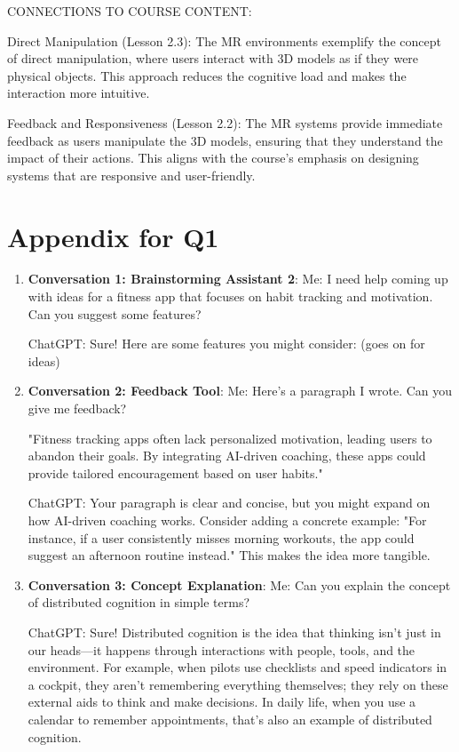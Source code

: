 \documentclass[
	letterpaper, %
]{jdf}
\begin{document}
CONNECTIONS TO COURSE CONTENT:

Direct Manipulation (Lesson 2.3): The MR environments exemplify the concept of direct manipulation, where users interact with 3D models as if they were physical objects. This approach reduces the cognitive load and makes the interaction more intuitive.

Feedback and Responsiveness (Lesson 2.2): The MR systems provide immediate feedback as users manipulate the 3D models, ensuring that they understand the impact of their actions. This aligns with the course’s emphasis on designing systems that are responsive and user-friendly.

\hfill \break  

\section{Appendix for Q1}

\printbibliography[heading=none]
\begin{enumerate}
    \item \textbf{Conversation 1: Brainstorming Assistant 2}: \hfill \break
    Me: I need help coming up with ideas for a fitness app that focuses on habit tracking and motivation. Can you suggest some features?

ChatGPT: Sure! Here are some features you might consider: (goes on for ideas) 
\item \textbf{Conversation 2: Feedback Tool}: \hfill \break Me: Here’s a paragraph I wrote. Can you give me feedback?

"Fitness tracking apps often lack personalized motivation, leading users to abandon their goals. By integrating AI-driven coaching, these apps could provide tailored encouragement based on user habits."

ChatGPT: Your paragraph is clear and concise, but you might expand on how AI-driven coaching works. Consider adding a concrete example: "For instance, if a user consistently misses morning workouts, the app could suggest an afternoon routine instead." This makes the idea more tangible.
\item \textbf{Conversation 3: Concept Explanation}: \hfill \break Me: Can you explain the concept of distributed cognition in simple terms?

ChatGPT: Sure! Distributed cognition is the idea that thinking isn’t just in our heads—it happens through interactions with people, tools, and the environment. For example, when pilots use checklists and speed indicators in a cockpit, they aren’t remembering everything themselves; they rely on these external aids to think and make decisions. In daily life, when you use a calendar to remember appointments, that’s also an example of distributed cognition.
     

\end{enumerate}
\end{document}
